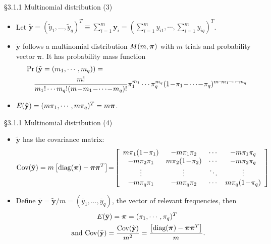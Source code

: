 \documentclass{beamer}
\newenvironment{wideitemize}%
  {\begin{itemize}%
    \setlength{\parskip}{1em}}%
  {\end{itemize}}
\begin{document}
\begin{frame}{\S3.1.1 Multinomial distribution (3)}
\begin{wideitemize}

\item
Let $\displaystyle \tilde{\textbf{y}} = (\tilde{y}_1, \dots, \tilde{y}_q)^T\equiv \sum_{i=1}^m \textbf{y}_i=\left(\sum_{i=1}^m y_{i1},
\cdots, \sum_{i=1}^m y_{iq}\right)^T$.

\item  $ \tilde{\textbf{y}}$ follows a multinomial distribution $M(m, \mbox{\boldmath $\pi$})$ with $m$ trials and probability vector ${\boldsymbol \pi}$. It has probability mass function {\small
\begin{eqnarray*}
\lefteqn{\mbox{Pr}\left(\tilde{\textbf{y}}=(m_1,\cdots,m_q)\right)=} & \\
&& \frac{m!}{m_1!\cdots m_q!(m\!-\!m_1\!-\!\cdots\!-\!m_q)!}
\pi_1^{m_1}\cdots \pi_q^{m_q}(1\!-\!\pi_1\!-\!\cdots\!-\!\pi_q)^{m\!-\!m_1\!-\!\cdots\!-\!m_q}
\end{eqnarray*}}

\item
 $E(\tilde{\textbf{y}})=(m\pi_1,\cdots,m\pi_q)^T=m\mbox{\boldmath $\pi$}$.

\end{wideitemize}
\end{frame}

\begin{frame}{\S3.1.1 Multinomial distribution (4)}
\begin{wideitemize}


\item $\tilde{\textbf{y}}$ has the covariance matrix: 
 {\footnotesize
$$\text{Cov}(\tilde{\textbf{y}})=m\left[\mbox{diag}(\mbox{\boldmath $\pi$})-\mbox{\boldmath $\pi$}
\mbox{\boldmath $\pi$}^T\right]\!=\!\left[\begin{array}{cccc} m\pi_1(1\!-\!\pi_1) & -m\pi_1\pi_2 & \cdots
& -m\pi_1\pi_q \\ -m\pi_2\pi_1 & m\pi_2(1\!-\!\pi_2) & \cdots & -m\pi_2\pi_q \\ \vdots & \vdots & \ddots 

& \vdots \\ -m\pi_q\pi_1 & -m\pi_q\pi_2 & \cdots & m\pi_q(1\!-\!\pi_q)\end{array}\right]$$}


\item
Define $\bar{\textbf{y}}=\tilde{\textbf{y}}/m = (\bar{y}_1, \dots, \bar{y}_q)$,  the vector of relevant frequencies, then 
\begin{multline*}
E(\bar{\textbf{y}})= \mbox{\boldmath $\pi$}  = (\pi_1,\cdots,\pi_q)^T\\
 \text{ and } \mbox{Cov}(\bar{\textbf{y}})=\frac{\mbox{Cov}(\tilde{\textbf{y}})}{m^2} =\frac{\left[\mbox{diag}(\mbox{\boldmath $\pi$})-\mbox{\boldmath $\pi$}
\mbox{\boldmath $\pi$}^T\right]}{m}.
\end{multline*}
\end{wideitemize}
\end{frame}
\end{document}
